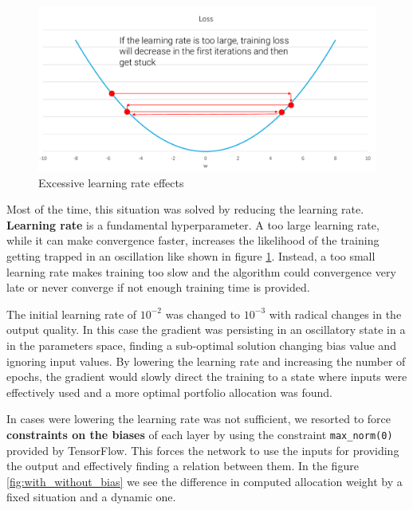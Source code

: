 \hfill \break

\begin{figure}[H]
    \includegraphics[width=12cm]{cap4/too_large_lr.png}
    \caption[Excessive learning rate effects]{Excessive learning rate effects \cite{salti_cv} }
    \label{fig:too_lage_lr}
\end{figure}

Most of the time, this situation was solved by reducing the learning rate.
\textbf{Learning rate} is a fundamental hyperparameter. A too large learning rate, while it can make convergence faster, increases the likelihood of the training getting trapped in an oscillation like shown in figure \ref{fig:too_lage_lr}. Instead, a too small learning rate makes training too slow and the algorithm could convergence very late or never converge if not enough training time is provided.

The initial learning rate of $10^{-2}$ was changed to $10^{-3}$  with radical changes in the output quality. In this case the gradient was persisting in an oscillatory state in a  in the parameters space, finding a sub-optimal solution changing bias value and ignoring input values. By lowering the learning rate and increasing the number of epochs, the gradient would slowly direct the training to a state where inputs were effectively used and a more optimal portfolio allocation was found.

\hfill \break

In cases were lowering the learning rate was not sufficient, we resorted to force \textbf{constraints on the biases} of each layer by using the constraint \texttt{max\_norm(0)} provided by TensorFlow. This forces the network to use the inputs for providing the output and effectively finding a relation between them.
In the figure \ref{fig:with_without_bias} we see the difference in computed allocation weight by a fixed situation and a dynamic one. 



